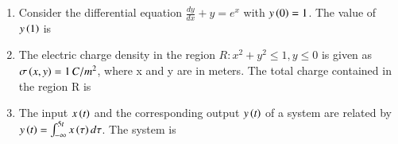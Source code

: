 \documentclass[journal,12pt,onecolumn]{IEEEtran}
\theoremstyle{remark}
\begin{document}
\begin{enumerate}
\item Consider the differential equation $\frac{dy}{dx} + y = e^x$ with $y\left(0\right) = 1$. The value of $y\left(1\right)$ is

\hfill{}
\begin{enumerate}  \end{enumerate}



\item The electric charge density in the region $R\colon x^2+y^2 \le 1, y \le 0$ is given as $\sigma\left(x,y\right) = 1 \, C/m^2$, where x and y are in meters. The total charge  contained in the region R is

\hfill{}\begin{enumerate}  \end{enumerate}



\item The input $x\left(t\right)$ and the corresponding output $y\left(t\right)$ of a system are related by $y\left(t\right) = \int_{-\infty}^{5t} x\left(\tau\right) d\tau$. The system is

\hfill{}\begin{enumerate}  \end{enumerate}




\end{enumerate}
\end{document}
